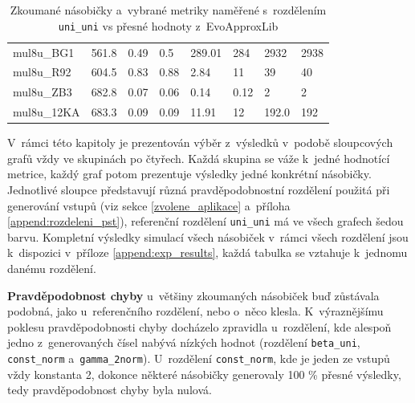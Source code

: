 \begin{table}[H]
{\begin{tabular}{|l|l|ll|ll|ll|}
mul8u\_BG1         & 561.8           & \multicolumn{1}{l|}{0.49}                            & 0.5                                     & \multicolumn{1}{l|}{289.01}                             & 284                                     & \multicolumn{1}{l|}{2932}                              & 2938                                     \\
mul8u\_R92         & 604.5           & \multicolumn{1}{l|}{0.83}                            & 0.88                                    & \multicolumn{1}{l|}{2.84}                               & 11                                      & \multicolumn{1}{l|}{39}                                & 40                                       \\
mul8u\_ZB3         & 682.8           & \multicolumn{1}{l|}{0.07}                            & 0.06                                    & \multicolumn{1}{l|}{0.14}                               & 0.12                                    & \multicolumn{1}{l|}{2}                                 & 2                                        \\
mul8u\_12KA        & 683.3           & \multicolumn{1}{l|}{0.09}                            & 0.09                                    & \multicolumn{1}{l|}{11.91}                              & 12                                      & \multicolumn{1}{l|}{192.0}                             & 192                                     
\end{tabular}}
\caption{Zkoumané násobičky a~vybrané metriky naměřené s~rozdělením \texttt{uni\_uni} vs přesné hodnoty z~EvoApproxLib}
\label{tab:ref_tab}
\end{table}

V~rámci této kapitoly je prezentován výběr z~výsledků v~podobě sloupcových grafů vždy ve skupinách po čtyřech. Každá skupina se váže k~jedné hodnotící metrice, každý graf potom prezentuje výsledky jedné konkrétní násobičky. Jednotlivé sloupce představují různá pravděpodobnostní rozdělení použitá při generování vstupů (viz sekce \ref{zvolene_aplikace} a~příloha \ref{append:rozdeleni_pst}), referenční rozdělení \texttt{uni\_uni} má ve všech grafech šedou barvu. Kompletní výsledky simulací všech násobiček v~rámci všech rozdělení jsou k~dispozici v~příloze \ref{append:exp_results}, každá tabulka se vztahuje k~jednomu danému rozdělení.

\bigskip

\textbf{Pravděpodobnost chyby} u~většiny zkoumaných násobiček buď zůstávala podobná, jako u~referenčního rozdělení, nebo o~něco klesla. K~výraznějšímu poklesu pravděpodobnosti chyby docházelo zpravidla u~rozdělení, kde alespoň jedno z~generovaných čísel nabývá nízkých hodnot (rozdělení \texttt{beta\_uni}, \texttt{const\_norm} a~\texttt{gamma\_2norm}). U~rozdělení \texttt{const\_norm}, kde je jeden ze vstupů vždy konstanta 2, dokonce některé násobičky generovaly 100 \% přesné výsledky, tedy pravděpodobnost chyby byla nulová. 

